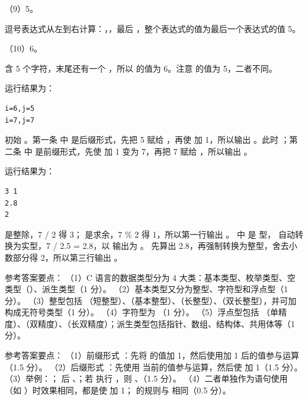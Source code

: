 \documentclass[a4paper,11pt]{article}
\begin{document}
\q （9）5。\begin{analysis}逗号表达式从左到右计算：，，最后 ，整个表达式的值为最后一个表达式的值 5。\end{analysis}

\q （10）6。\begin{analysis} 含 5 个字符，末尾还有一个 ，所以  的值为 6。注意  的值为 5，二者不同。\end{analysis}


\q 运行结果为：
\begin{lstlisting}
i=6,j=5
i=7,j=7
\end{lstlisting}
\begin{analysis}初始 。第一条  中  是后缀形式，先把 5 赋给 ，再使  加 1，所以输出 。此时 ；第二条  中  是前缀形式，先使  加 1 变为 7，再把 7 赋给 ，所以输出 。\end{analysis}

\q 运行结果为：
\begin{lstlisting}
3 1
2.8
2
\end{lstlisting}
\begin{analysis} 是整除，7 / 2 得 3； 是求余，7 \% 2 得 1，所以第一行输出 。 中  是  型， 自动转换为实型，7 / 2.5 = 2.8，以  输出为 。 先算出 2.8，再强制转换为整型，舍去小数部分得 2，所以第三行输出 。\end{analysis}


\q 参考答案要点：
（1）C 语言的数据类型分为 4 大类：基本类型、枚举类型、空类型（）、派生类型（1 分）。
（2）基本类型又分为整型、字符型和浮点型（1 分）。
（3）整型包括 （短整型）、（基本整型）、（长整型）、（双长整型），并可加  构成无符号类型（1 分）。
（4）字符型为 （1 分）。
（5）浮点型包括 （单精度）、（双精度）、（长双精度）；派生类型包括指针、数组、结构体、共用体等（1 分）。

\q 参考答案要点：
（1）前缀形式 ：先将  的值加 1，然后使用加 1 后的值参与运算（1.5 分）。
（2）后缀形式 ：先使用  当前的值参与运算，然后使  加 1（1.5 分）。
（3）举例：； 后 、；若  执行 ，则 、（1.5 分）。
（4）二者单独作为语句使用（如 ）时效果相同，都是使  加 1；\code{--} 的规则与 \code{++} 相同（0.5 分）。
\end{document}
